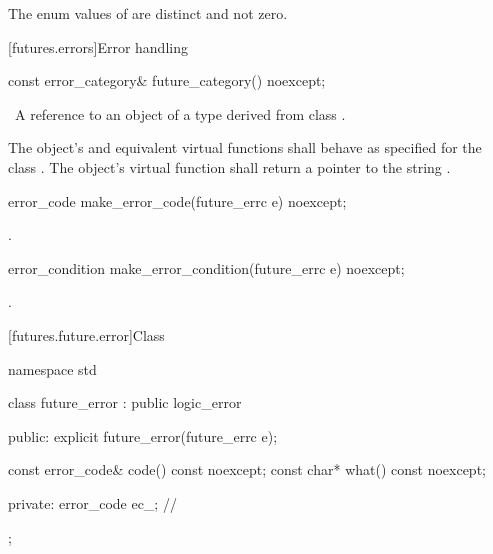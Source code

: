 \pnum
The enum values of  are distinct and not zero.

[futures.errors]{Error handling}

%
\begin{itemdecl}
const error_category& future_category() noexcept;
\end{itemdecl}

\begin{itemdescr}
\pnum
\returns\ A reference to an object of a type derived from class .

\pnum
The object's  and equivalent virtual functions shall
behave as specified for the class . The object's 
virtual function shall return a pointer to the string .
\end{itemdescr}

%
\begin{itemdecl}
error_code make_error_code(future_errc e) noexcept;
\end{itemdecl}

\begin{itemdescr}
\pnum
\returns {}.
\end{itemdescr}

%
\begin{itemdecl}
error_condition make_error_condition(future_errc e) noexcept;
\end{itemdecl}

\begin{itemdescr}
\pnum
\returns {}.
\end{itemdescr}

[futures.future.error]{Class }

%
\begin{codeblock}
namespace std {
  class future_error : public logic_error {
  public:
    explicit future_error(future_errc e);

    const error_code& code() const noexcept;
    const char*       what() const noexcept;

  private:
    error_code ec_;             // \expos
  };
}
\end{codeblock}

